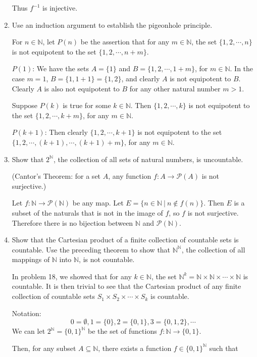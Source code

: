 \documentclass[a4paper,10pt]{book}
\theoremstyle{plain} %
\begin{document}
\begin{enumerate}
	Thus $f^{-1}$ is injective.   
	\item Use an induction argument to establish the pigeonhole principle.\par
	For $n \in \mathbb{N}$, let $P(n)$ be the assertion that for any $m \in \mathbb{N}$, the set $\{1,2, \cdots, n\}$ is not equipotent to the set $\{1,2, \cdots, n+m\}$.\par
	$P(1)$: We have the sets $A=\{1\}$ and $B=\{1,2, \cdots, 1+m\}$, for $m \in \mathbb{N}$.
	In the case $m=1$, $B=\{1,1+1\}=\{1,2\}$, and clearly $A$ is not equipotent to $B$. Clearly $A$ is also not equipotent to $B$ for any other natural number $m>1$.\par
	Suppose $P(k)$ is true for some $k \in \mathbb{N}$. Then $\{1,2, \cdots, k\}$ is not equipotent to the set $\{1,2, \cdots, k+m\}$, for any $m \in \mathbb{N}$.\par
	$P(k+1)$: Then clearly $\{1,2, \cdots, k+1\}$ is not equipotent to the set $\{1,2, \cdots, (k+1), \cdots, (k+1)+m\}$, for any $m \in \mathbb{N}$.
	\item Show that $2^{\mathbb{N}}$, the collection of all sets of natural numbers, is uncountable.\par
	(Cantor's Theorem: for a set $A$, any function $f:A\to \mathcal{P}(A)$ is not surjective.)\par
	Let $f:\mathbb{N}\to \mathcal{P}(\mathbb{N})$ be any map. Let $E = \{n \in \mathbb{N}\ | \ n \notin f(n) \}$. 
	Then $E$ is a subset of the naturals that is not in the image of $f$, so $f$ is not surjective. 
	Therefore there is no bijection between $\mathbb{N}$ and  $\mathcal{P}(\mathbb{N})$.
	\item Show that the Cartesian product of a finite collection of countable sets is countable. Use the preceding theorem to show that $\mathbb{N}^{\mathbb{N}}$, the collection of all mappings of $\mathbb{N}$ into $\mathbb{N}$, is not countable.\par
	In problem 18, we showed that for any $k \in \mathbb{N}$, the set $\mathbb{N}^k = \mathbb{N} \times \mathbb{N} \times \cdots \times \mathbb{N}$ is countable. 
	It is then trivial to see that the Cartesian product of any finite collection of countable sets $S_1 \times S_2 \times \cdots \times S_k$ is countable.\par
	Notation:
	\[
		0=\emptyset, 1= \{0\}, 2=\{0,1\}, 3 = \{0,1,2\}, \cdots
	\]
	We can let $2^{\mathbb{N}}= \{0,1\}^{\mathbb{N}}$ be the set of functions $f:\mathbb{N} \to \{0,1\}$.\par
	Then, for any subset $A \subseteq \mathbb{N}$, there exists a function $f \in \{0,1\}^{\mathbb{N}}$ such that 

\end{enumerate}
\end{document}

